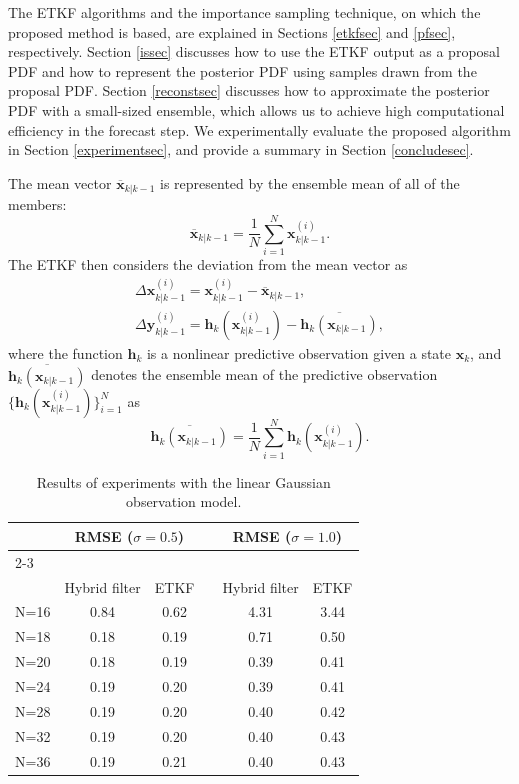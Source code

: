 \documentclass[useAMS,usenatbib]{tellus}
\renewcommand{\vec}[1]{\boldsymbol{#1}}  %
\newcommand{\xavg}{\overline{\vec{x}}}
\begin{document}
The ETKF algorithms and the importance sampling technique,
on which the proposed method is based,
are explained in Sections \ref{etkfsec} and \ref{pfsec},
respectively.
Section \ref{issec} discusses how to use the ETKF output
as a proposal PDF and how to represent the posterior PDF using
samples drawn from the proposal PDF.
Section \ref{reconstsec} discusses how to approximate the posterior
PDF with a small-sized ensemble, which allows us to
achieve high computational efficiency in the forecast step.
We experimentally evaluate the proposed algorithm in
Section \ref{experimentsec}, and provide a summary
in Section \ref{concludesec}.

The mean vector $\xavg _{k|k-1}$ is represented by
the ensemble mean of all of the members:
\begin{equation}
 \xavg _{k|k-1}=\frac{1}{N}\sum _{i=1}^N\vec{x}_{k|k-1}^{(i)}. \label{xavg}
\end{equation}
The ETKF then considers the deviation from the mean vector as
\begin{gather}
\Delta \vec{x}_{k|k-1}^{(i)}=\vec{x}_{k|k-1}^{(i)}-\overline{\vec{x}}_{k|k-1}, \label{delxdef} \\
\Delta \vec{y}_{k|k-1}^{(i)}=\vec{h}_{k}(\vec{x}_{k|k-1}^{(i)})-\overline{\vec{h}_{k}(\vec{x}_{k|k-1})}, \label{delydef}
\end{gather}
where the function $\vec{h}_{k}$ is a nonlinear predictive
observation given a state $\vec{x}_k$,
and $\overline{\vec{h}_{k}(\vec{x}_{k|k-1})}$ denotes the ensemble
mean of the predictive observation
$\{\vec{h}_{k}(\vec{x}_{k|k-1}^{(i)})\}_{i=1}^N$ as
\begin{equation}
 \overline{\vec{h}_{k}(\vec{x}_{k|k-1})}=\frac{1}{N}\sum _{i=1}^N
        \vec{h}_{k}(\vec{x}_{k|k-1}^{(i)}) . \label{hxavg}
\end{equation}

\begin{table}
\caption{Results of experiments with the linear Gaussian
observation model.}
\label{lineargaussian}
\begin{tabular}{@{}lccc@{}cc}%
\hline
 & \multicolumn{2}{c}{RMSE ($\sigma =0.5$)}&
 & \multicolumn{2}{c}{RMSE ($\sigma =1.0$)} \\[1pt]
 \cline{2-3}\cline{5-6}\\[-7pt]
 & \multicolumn{1}{c}{Hybrid filter} & \multicolumn{1}{c}{ETKF}
& & \multicolumn{1}{c}{Hybrid filter} & \multicolumn{1}{c}{ETKF} \\
\hline
N=16 & 0.84 & 0.62 && 4.31 & 3.44 \\
N=18 & 0.18 & 0.19 && 0.71 & 0.50 \\
N=20 & 0.18 & 0.19 && 0.39 & 0.41 \\
N=24 & 0.19 & 0.20 && 0.39 & 0.41 \\
N=28 & 0.19 & 0.20 && 0.40 & 0.42 \\
N=32 & 0.19 & 0.20 && 0.40 & 0.43 \\
N=36 & 0.19 & 0.21 && 0.40 & 0.43 \\
\hline
\end{tabular}
\end{table}
\end{document}
